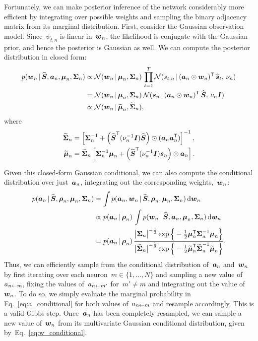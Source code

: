 Fortunately, we can make posterior inference of the
network considerably more efficient by integrating over
possible weights and sampling the binary adjacency
matrix from its marginal distribution. 
First, consider the Gaussian observation model.
Since~$\psi_{t,n}$ is linear in~$\boldsymbol{w}_n$, the likelihood
is conjugate with the Gaussian prior, and hence the
posterior is Gaussian as well. We can
compute the posterior distribution in closed form:
\begin{align}
  p(\boldsymbol{w}_n \,|\, \widehat{\boldsymbol{S}}, \boldsymbol{a}_n, \boldsymbol{\mu}_n, \boldsymbol{\Sigma}_n)
  &\propto
  \mathcal{N}(\boldsymbol{w}_n \,|\, \boldsymbol{\mu}_n, \boldsymbol{\Sigma}_n) \,
  \prod_{t=1}^T \mathcal{N}(s_{t,n} \,|\, (\boldsymbol{a}_n \odot \boldsymbol{w}_n)^{\mathsf{T}} \, \widehat{\boldsymbol{s}}_t, \, \nu_n) \\
  &= \mathcal{N}(\boldsymbol{w}_n \,|\, \boldsymbol{\mu}_n, \boldsymbol{\Sigma}_n) \,
  \mathcal{N}(\boldsymbol{s}_n \,|\, (\boldsymbol{a}_n \odot \boldsymbol{w}_n)^{\mathsf{T}} \, \widehat{\boldsymbol{S}}, \, \nu_n \boldsymbol{I}) \\
  \label{eq:w_conditional}
  &\propto \mathcal{N}(\boldsymbol{w}_n \,|\, \widetilde{\boldsymbol{\mu}}_n, \widetilde{\boldsymbol{\Sigma}}_n),
\end{align}
where
\begin{align}
  \widetilde{\boldsymbol{\Sigma}}_n &= \left[ \boldsymbol{\Sigma}_n^{-1} +
  \left(\widehat{\boldsymbol{S}}^{\mathsf{T}} (\nu_n^{-1} \boldsymbol{I}) \widehat{\boldsymbol{S}} \right) \odot (\boldsymbol{a}_n \boldsymbol{a}_n^{\mathsf{T}}) \right]^{-1}, \\
  \widetilde{\boldsymbol{\mu}}_n &= \widetilde{\boldsymbol{\Sigma}}_n \left[ \boldsymbol{\Sigma}_n^{-1} \boldsymbol{\mu}_n +
  \left(\widehat{\boldsymbol{S}}^{\mathsf{T}} (\nu_n^{-1} \boldsymbol{I})\boldsymbol{s}_n \right) \odot \boldsymbol{a}_n \right].
\end{align}

Given this closed-form Gaussian conditional, we can also compute
the conditional distribution over just~$\boldsymbol{a}_n$, integrating out
the corresponding weights,~$\boldsymbol{w}_n$:
\begin{align}
  p(\boldsymbol{a}_n \,|\, \widehat{\boldsymbol{S}}, \boldsymbol{\rho}_n, \boldsymbol{\mu}_n, \boldsymbol{\Sigma}_n)
  &= \int p(\boldsymbol{a}_n, \boldsymbol{w}_n \,|\, \widehat{\boldsymbol{S}}, \boldsymbol{\rho}_n, \boldsymbol{\mu}_n, \boldsymbol{\Sigma}_n) \, \mathrm{d} \boldsymbol{w}_n \\
  &\propto p(\boldsymbol{a}_n \,|\, \boldsymbol{\rho}_n) \, \int p(\boldsymbol{w}_n \,|\, \widehat{\boldsymbol{S}}, \boldsymbol{a}_n, \boldsymbol{\mu}_n, \boldsymbol{\Sigma}_n) \, \mathrm{d} \boldsymbol{w}_n \\
  \label{eq:a_conditional}
  &= p(\boldsymbol{a}_n \,|\, \boldsymbol{\rho}_n) \, \frac{\big| \boldsymbol{\Sigma}_n \big|^{-\frac{1}{2}} \exp \Big \{-\frac{1}{2} \boldsymbol{\mu}_n^{\mathsf{T}} \boldsymbol{\Sigma}_n^{-1} \boldsymbol{\mu}_n \Big \} }
  {\big| \widetilde{\boldsymbol{\Sigma}}_n \big|^{-\frac{1}{2}} \exp \Big \{-\frac{1}{2} \widetilde{\boldsymbol{\mu}}_n^{\mathsf{T}} \widetilde{\boldsymbol{\Sigma}}_n^{-1} \widetilde{\boldsymbol{\mu}}_n \Big \}}.
\end{align}
Thus, we can efficiently sample from the conditional
distribution of~$\boldsymbol{a}_n$ and~$\boldsymbol{w}_n$ by first iterating
over each neuron~${m \in \{1, \ldots, N\}}$ and sampling
a new value of~$a_{n \leftarrow m}$, fixing the values of~$a_{n \leftarrow m'}$
for~$m' \neq m$ and integrating out the value of~$\boldsymbol{w}_n$.
To do so, we simply evaluate the marginal probability in Eq.~\ref{eq:a_conditional}
for both values of~$a_{n \leftarrow m}$ and resample accordingly.
This is a valid Gibbs step. Once~$\boldsymbol{a}_n$ has been completely
resampled, we can sample a new value of~$\boldsymbol{w}_n$ from its multivariate
Gaussian conditional distribution, given by~Eq.~\ref{eq:w_conditional}.

